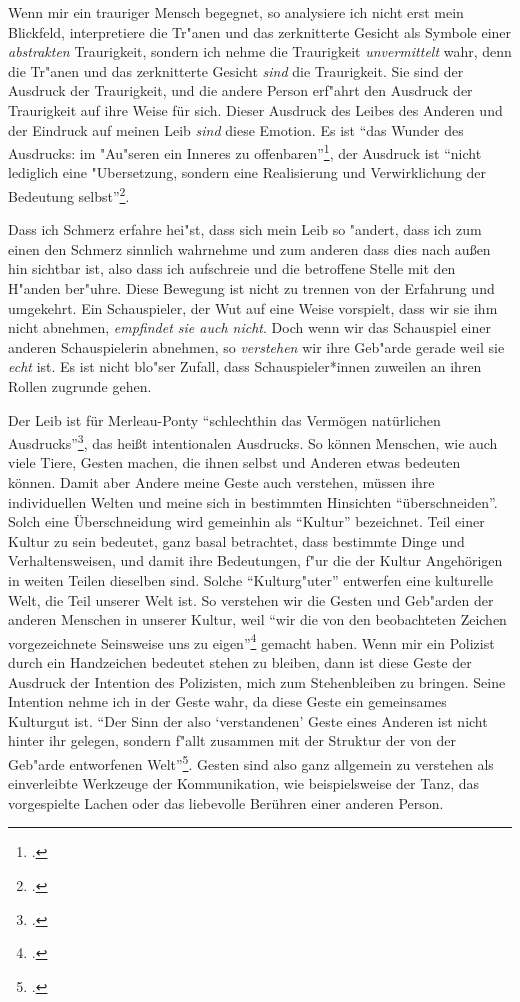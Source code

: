 \documentclass[a4paper, 12pt]{article}
\begin{document}
\begin{onehalfspace}
Wenn mir ein trauriger Mensch begegnet, so analysiere ich nicht erst mein Blickfeld, interpretiere die Tr"anen und das zerknitterte Gesicht als Symbole einer \emph{abstrakten} Traurigkeit, sondern ich nehme die Traurigkeit \emph{unvermittelt} wahr, denn die Tr"anen und das zerknitterte Gesicht \emph{sind} die Traurigkeit. Sie sind der Ausdruck der Traurigkeit, und die andere Person erf"ahrt den Ausdruck der Traurigkeit auf ihre Weise für sich. Dieser Ausdruck des Leibes des Anderen und der Eindruck auf meinen Leib \emph{sind} diese Emotion. Es ist "`das Wunder des Ausdrucks: im "Au"seren ein Inneres zu offenbaren"'\footnote{\Cite[Siehe][S. 370]{merleau1966phanomenologie}.}, der Ausdruck ist "`nicht lediglich eine "Ubersetzung, sondern eine Realisierung und Verwirklichung der Bedeutung selbst"'\footnote{\Cite[Siehe][S. 217]{merleau1966phanomenologie}.}. 

Dass ich Schmerz erfahre hei"st, dass sich mein Leib so "andert, dass ich zum einen den Schmerz sinnlich wahrnehme und zum anderen dass dies nach außen hin sichtbar ist, also dass ich aufschreie und die betroffene Stelle mit den H"anden ber"uhre. Diese Bewegung ist nicht zu trennen von der Erfahrung und umgekehrt. Ein Schauspieler, der Wut auf eine Weise vorspielt, dass wir sie ihm nicht abnehmen, \emph{empfindet sie auch nicht}. Doch wenn wir das Schauspiel einer anderen Schauspielerin abnehmen, so \emph{verstehen} wir ihre Geb"arde gerade weil sie \emph{echt} ist. Es ist nicht blo"ser Zufall, dass Schauspieler*innen zuweilen an ihren Rollen zugrunde gehen. 

Der Leib ist für Merleau-Ponty "`schlechthin das Vermögen natürlichen Ausdrucks"'\footnote{\Cite[Siehe][S. 215]{merleau1966phanomenologie}.}, das heißt intentionalen Ausdrucks. So können Menschen, wie auch viele Tiere, Gesten machen, die ihnen selbst und Anderen etwas bedeuten können. Damit aber Andere meine Geste auch verstehen, müssen ihre individuellen Welten und meine sich in bestimmten Hinsichten "`überschneiden"'. Solch eine Überschneidung wird gemeinhin als "`Kultur"' bezeichnet. Teil einer Kultur zu sein bedeutet, ganz basal betrachtet, dass bestimmte Dinge und Verhaltensweisen, und damit ihre Bedeutungen, f"ur die der Kultur Angehörigen in weiten Teilen dieselben sind. Solche "`Kulturg"uter"' entwerfen eine kulturelle Welt, die Teil unserer Welt ist. So verstehen wir die Gesten und Geb"arden der anderen Menschen in unserer Kultur, weil "`wir die von den beobachteten Zeichen vorgezeichnete Seinsweise uns zu eigen"'\footnote{\Cite[Siehe][S. 370]{merleau1966phanomenologie}.} gemacht haben. Wenn mir ein Polizist durch ein Handzeichen bedeutet stehen zu bleiben, dann ist diese Geste der Ausdruck der Intention des Polizisten, mich zum Stehenbleiben zu bringen. Seine Intention nehme ich in der Geste wahr, da diese Geste ein gemeinsames Kulturgut ist. "`Der Sinn der also `verstandenen' Geste eines Anderen ist nicht hinter ihr gelegen, sondern f"allt zusammen mit der Struktur der von der Geb"arde entworfenen Welt"'\footnote{\Cite[Siehe][S. 220]{merleau1966phanomenologie}.}. Gesten sind also ganz allgemein zu verstehen als einverleibte Werkzeuge der Kommunikation, wie beispielsweise der Tanz, das vorgespielte Lachen oder das liebevolle Berühren einer anderen Person.


\end{onehalfspace}
\end{document}

